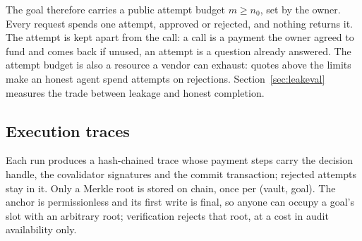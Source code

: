 The goal therefore carries a public attempt budget $m \ge n_0$, set by the owner. Every request spends one attempt, approved or rejected, and nothing
returns it. The attempt is kept apart from the call: a call is a payment the owner agreed to fund and comes back if unused, an attempt is a question
already answered. The attempt budget is also a resource a vendor can exhaust: quotes above the limits make an honest agent spend attempts on
rejections. Section~\ref{sec:leakeval} measures the trade between leakage and honest completion.

\subsection{Execution traces}

Each run produces a hash-chained trace whose payment steps carry the decision handle, the covalidator signatures and the commit transaction;
rejected attempts stay in it. Only a Merkle root is stored on chain, once per (vault, goal). The anchor is permissionless and its first write is final,
so anyone can occupy a goal's slot with an arbitrary root; verification rejects that root, at a cost in audit availability only.
